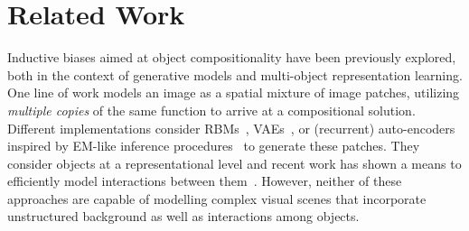 \documentclass{article}
\begin{document}
\section{Related Work}
Inductive biases aimed at object compositionality have been previously explored, both in the context of generative models and multi-object representation learning.
One line of work models an image as a spatial mixture of image patches, utilizing \emph{multiple copies} of the same function to arrive at a compositional solution. 
Different implementations consider RBMs~\citep{le2011learning}, VAEs~\citep{nash17}, or (recurrent) auto-encoders inspired by EM-like inference procedures~\citep{greff2016tagger, greff2017neural} to generate these patches.
They consider objects at a representational level and recent work has shown a means to efficiently model interactions between them~\citep{steenkiste2018relational}.
However, neither of these approaches are capable of modelling complex visual scenes that incorporate unstructured background as well as interactions among objects.
\end{document}
